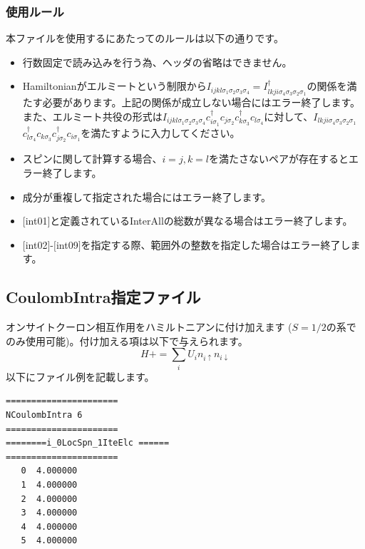 \subsubsection{使用ルール}
本ファイルを使用するにあたってのルールは以下の通りです。
\begin{itemize}
\item 行数固定で読み込みを行う為、ヘッダの省略はできません。
\item Hamiltonianがエルミートという制限から$I_{ijkl\sigma_1\sigma_2\sigma_3\sigma_4}=I_{lkji\sigma_4\sigma_3\sigma_2\sigma_1}^{\dag}$の関係を満たす必要があります。上記の関係が成立しない場合にはエラー終了します。
また、エルミート共役の形式は$I_{ijkl\sigma_1\sigma_2\sigma_3\sigma_4}c_{i\sigma_1}^{\dagger}c_{j\sigma_2}c_{k\sigma_3}^{\dagger}c_{l\sigma_4}$に対して、$I_{lkji\sigma_4\sigma_3\sigma_2\sigma_1}$
$c_{l\sigma_4}^{\dagger}c_{k\sigma_3}c_{j\sigma_2}^{\dagger}c_{i\sigma_1}$を満たすように入力してください。
\item スピンに関して計算する場合、$i=j, k=l$を満たさないペアが存在するとエラー終了します。
\item 成分が重複して指定された場合にはエラー終了します。
\item $[$int01$]$と定義されているInterAllの総数が異なる場合はエラー終了します。
\item $[$int02$]$-$[$int09$]$を指定する際、範囲外の整数を指定した場合はエラー終了します。
\end{itemize}


\newpage
\subsection{CoulombIntra指定ファイル}
\label{Subsec:coulombintra}
オンサイトクーロン相互作用をハミルトニアンに付け加えます{ ($S=1/2$の系でのみ使用可能)}。付け加える項は以下で与えられます。
\begin{equation}
H+=\sum_{i}U_i n_ {i \uparrow}n_{i \downarrow}
\end{equation}
以下にファイル例を記載します。

\begin{minipage}{12.5cm}
\begin{screen}
\begin{verbatim}
====================== 
NCoulombIntra 6  
====================== 
========i_0LocSpn_1IteElc ====== 
====================== 
   0  4.000000
   1  4.000000
   2  4.000000
   3  4.000000
   4  4.000000
   5  4.000000
\end{verbatim}
\end{screen}
\end{minipage}

